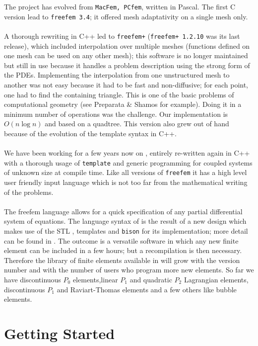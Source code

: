 \documentclass[a4paper,twoside,12pt]{book}
\begin{document}
The project has evolved from \texttt{MacFem, PCfem}, written in
Pascal. The first C version lead to \texttt{freefem 3.4}; it offered
mesh adaptativity on a single mesh only.
\\\\
A thorough rewriting in C++ led to \texttt{freefem+}
(\texttt{freefem+ 1.2.10} was its last release), which included
interpolation over multiple meshes (functions defined on one mesh
can be used on any other mesh); this software is no longer
maintained but still in use because it handles a problem description
using the strong form of the PDEs. Implementing the interpolation
from one unstructured mesh to another was not easy because it had to
be fast and non-diffusive; for each point, one had to find the
containing triangle. This is one of the basic problems of
computational geometry (see Preparata \& Shamos\cite{Preparata} for
example). Doing it in a minimum number of operations was the
challenge. Our implementation is $O(n\log n)$ and based on a
quadtree.  This version also grew out of hand because of the
evolution of the template syntax in C++.
 \\\\
We have been working for a few years now on \freefempp, entirely
re-written again in C++ with a thorough usage of {\tt template} and
generic programming
for coupled systems of unknown size at compile time. Like all
versions of \texttt{freefem} it has a high level user friendly input
language which is not too far from the mathematical writing of the
problems.
\\\\

The freefem language allows for a quick specification of any partial
differential system of equations.  The language syntax of \freefempp
is the result of a new design which makes use of the STL \cite{cpp},
templates and \texttt{bison} for its implementation; more detail can
be found in \cite{FHcpp}.
  The outcome is a
versatile software in which any new finite element can be included
in a few hours; but a recompilation is then necessary.  Therefore
the library of finite elements available in \freefempp will grow
with the version number and with the number of users who program
more new elements. So far we have discontinuous $P_0$
elements,linear $P_1$ and quadratic $P_2$ Lagrangian elements,
discontinuous $P_1$ and Raviart-Thomas elements and a few others like bubble elements.


\section{Getting Started}
\label{sec:example}
\end{document}
